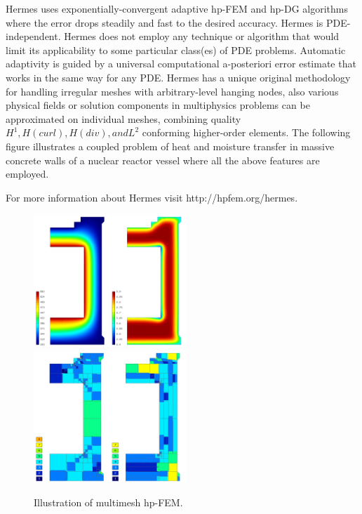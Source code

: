 \documentclass[12pt]{elsarticle}
\begin{document}
Hermes uses exponentially-convergent adaptive hp-FEM and hp-DG algorithms where the error drops steadily and fast to the desired accuracy.
Hermes is PDE-independent. Hermes does not employ any technique or algorithm that would limit its applicability to some particular class(es) of PDE problems. Automatic adaptivity is guided by a universal computational a-posteriori error estimate that works in the same way for any PDE.
Hermes has a unique original methodology for handling irregular meshes with arbitrary-level hanging nodes, also various physical fields or solution components in multiphysics problems can be approximated on individual meshes, combining quality $H^1, H(curl), H(div), and L^2$ conforming higher-order elements. The following figure illustrates a coupled problem of heat and moisture transfer in massive concrete walls of a nuclear reactor vessel where all the above features are employed.

For more information about Hermes visit {http://hpfem.org/hermes}.

\begin{figure}[!ht]
\centering
\includegraphics[height=5cm]{img/hermes_hm_sol.png}
\hspace{10mm}
\includegraphics[height=5cm]{img/hermes_hm_mesh.png}
\caption{Illustration of multimesh hp-FEM.}
\label{fig:hermes_hm}
\end{figure}
\noindent








\end{document}
